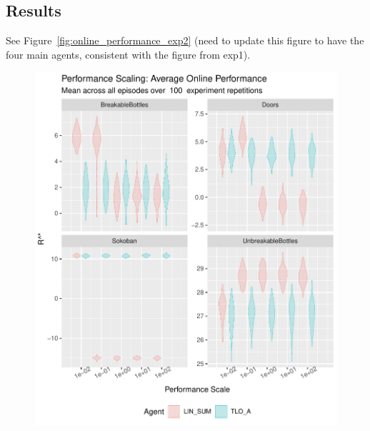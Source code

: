 \subsection{Results}

See Figure~\ref{fig:online_performance_exp2} (need to update this figure to have the four main agents, consistent with the figure from exp1).

\begin{figure}
  \includegraphics[width=\columnwidth]{output/multirun_n100_reward_to_util_transformonline_4agents_Performance.pdf}

\end{figure}

